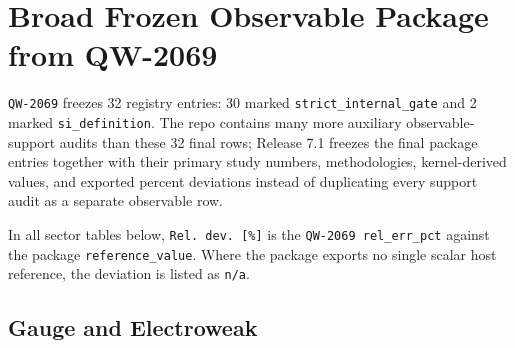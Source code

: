 \documentclass[11pt,a4paper]{article}
\begin{document}
\section{Broad Frozen Observable Package from QW-2069}

\texttt{QW-2069} freezes 32 registry entries: 30 marked
\texttt{strict\_internal\_gate} and 2 marked \texttt{si\_definition}. The
repo contains many more auxiliary observable-support audits than these 32 final
rows; Release 7.1 freezes the final package entries together with their primary
study numbers, methodologies, kernel-derived values, and exported percent
deviations instead of duplicating every support audit as a separate observable
row.

In all sector tables below, \texttt{Rel. dev. [\%]} is the
\texttt{QW-2069 rel\_err\_pct} against the package \texttt{reference\_value}.
Where the package exports no single scalar host reference, the deviation is
listed as \texttt{n/a}.

\subsection{Gauge and Electroweak}
\end{document}
